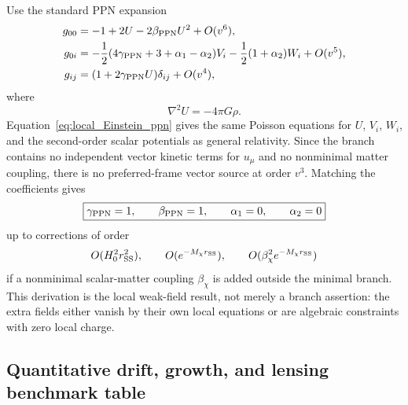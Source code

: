 \documentclass[aps,prd,reprint,nofootinbib,superscriptaddress,longbibliography]{revtex4-2}
\begin{document}
Use the standard PPN expansion
\begin{align}
  g_{00}&=-1+2U-2\beta_{\rm PPN}U^2+O(v^6),\\
  g_{0i}&=-\frac12(4\gamma_{\rm PPN}+3+\alpha_1-\alpha_2)V_i
          -\frac12(1+\alpha_2)W_i+O(v^5),\\
  g_{ij}&=(1+2\gamma_{\rm PPN}U)\delta_{ij}+O(v^4),
\end{align}
where
\begin{equation}
  \nabla^2U=-4\pi G\rho .
\end{equation}
Equation~\eqref{eq:local_Einstein_ppn} gives the same Poisson equations for $U$, $V_i$, $W_i$, and the second-order scalar potentials as general relativity. Since the branch contains no independent vector kinetic terms for $u_\mu$ and no nonminimal matter coupling, there is no preferred-frame vector source at order $v^3$. Matching the coefficients gives
\begin{equation}
  \boxed{\gamma_{\rm PPN}=1,
  \qquad
  \beta_{\rm PPN}=1,
  \qquad
  \alpha_1=0,
  \qquad
  \alpha_2=0}
  \label{eq:PPN_box_addendum}
\end{equation}
up to corrections of order
\begin{equation}
  O(H_0^2r_{\rm SS}^2),
  \qquad O(e^{-M_\chi r_{\rm SS}}),
  \qquad O(\beta_\chi^2e^{-M_\chi r_{\rm SS}})
\end{equation}
if a nonminimal scalar-matter coupling $\beta_\chi$ is added outside the minimal branch. This derivation is the local weak-field result, not merely a branch assertion: the extra fields either vanish by their own local equations or are algebraic constraints with zero local charge.

\subsection{Quantitative drift, growth, and lensing benchmark table}
\label{app:forecast_table_addendum}
\end{document}
